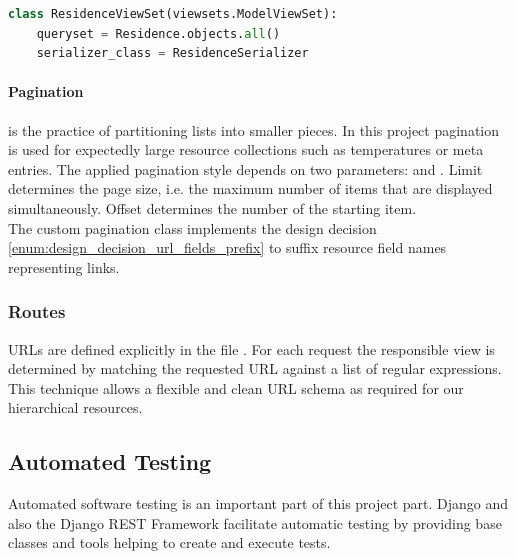 \begin{lstlisting}[label={lst:server_infrastructure_view_residenceViewSet},language={Python},
caption={The \highlight{ResidenceViewSet} class.
}]
class ResidenceViewSet(viewsets.ModelViewSet):
	queryset = Residence.objects.all()
	serializer_class = ResidenceSerializer
\end{lstlisting}


\paragraph{Pagination} is the practice of partitioning lists into smaller pieces.
In this project pagination is used for expectedly large resource collections such as temperatures or meta entries.
The applied pagination style depends on two parameters:  and .
Limit determines the page size, i.e. the maximum number of items that are displayed simultaneously.
Offset determines the number of the starting item.\\
The custom pagination class  implements the design decision \ref{enum:design_decision_url_fields_prefix} to suffix resource field names representing links.

\subsubsection{Routes}
\label{sec:server_infrastructure_routers}

URLs are defined explicitly in the file .
For each request the responsible view is determined by matching the requested URL against a list of regular expressions.
This technique allows a flexible and clean URL schema as required for our hierarchical resources.



\subsection{Automated Testing}
\label{sec:server_infrastructure_testing}

Automated software testing is an important part of this project part. Django and also the Django REST Framework facilitate automatic testing by providing base classes and tools helping to create and execute tests.

